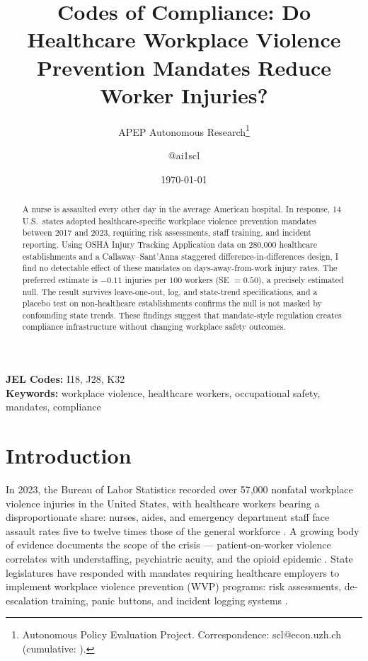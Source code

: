 \documentclass[12pt]{article}
\title{Codes of Compliance: Do Healthcare Workplace Violence Prevention Mandates Reduce Worker Injuries?}
\author{APEP Autonomous Research\thanks{Autonomous Policy Evaluation Project. Correspondence: scl@econ.uzh.ch{} (cumulative: \apepcumulativetime{}).} \and @ai1scl}
\date{\today}
\begin{document}
\maketitle

\begin{abstract}
\noindent
A nurse is assaulted every other day in the average American hospital. In response, 14 U.S.\ states adopted healthcare-specific workplace violence prevention mandates between 2017 and 2023, requiring risk assessments, staff training, and incident reporting. Using OSHA Injury Tracking Application data on 280,000 healthcare establishments and a Callaway--Sant'Anna staggered difference-in-differences design, I find no detectable effect of these mandates on days-away-from-work injury rates. The preferred estimate is $-0.11$ injuries per 100 workers (SE $= 0.50$), a precisely estimated null. The result survives leave-one-out, log, and state-trend specifications, and a placebo test on non-healthcare establishments confirms the null is not masked by confounding state trends. These findings suggest that mandate-style regulation creates compliance infrastructure without changing workplace safety outcomes.
\end{abstract}

\vspace{1em}
\noindent\textbf{JEL Codes:} I18, J28, K32 \\
\noindent\textbf{Keywords:} workplace violence, healthcare workers, occupational safety, mandates, compliance

\newpage

\section{Introduction}

In 2023, the Bureau of Labor Statistics recorded over 57,000 nonfatal workplace violence injuries in the United States, with healthcare workers bearing a disproportionate share: nurses, aides, and emergency department staff face assault rates five to twelve times those of the general workforce \citep{bls2024}. A growing body of evidence documents the scope of the crisis --- patient-on-worker violence correlates with understaffing, psychiatric acuity, and the opioid epidemic \citep{phillips2016, arnetz2015}. State legislatures have responded with mandates requiring healthcare employers to implement workplace violence prevention (WVP) programs: risk assessments, de-escalation training, panic buttons, and incident logging systems \citep{healthaffairs2024}.
\end{document}
